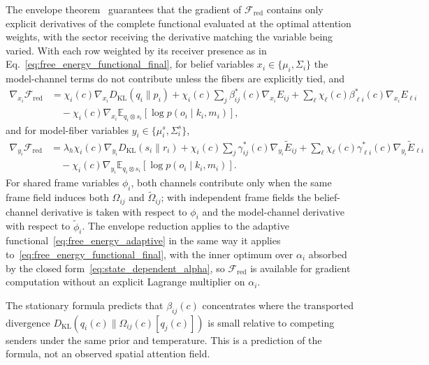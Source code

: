 \documentclass[11pt]{article}
\begin{document}
The envelope theorem~\cite{MilgromSegal2002} guarantees that the gradient of $\mathcal{F}_{\mathrm{red}}$ contains only explicit derivatives of the complete functional evaluated at the optimal attention weights, with the sector receiving the derivative matching the variable being varied. With each row weighted by its receiver presence as in Eq.~\eqref{eq:free_energy_functional_final}, for belief variables $x_i \in \{\mu_i,\Sigma_i\}$ the model-channel terms do not contribute unless the fibers are explicitly tied, and
\begin{equation}
\begin{aligned}
\nabla_{x_i}\mathcal{F}_{\mathrm{red}}
&= \chi_i(c)\nabla_{x_i}D_{\mathrm{KL}}(q_i\|p_i)
+ \chi_i(c)\sum_j \beta^*_{ij}(c)\nabla_{x_i}E_{ij}
+ \sum_\ell \chi_\ell(c)\beta^*_{\ell i}(c)\nabla_{x_i}E_{\ell i} \\
&\quad - \chi_i(c)\nabla_{x_i}\mathbb{E}_{q_i\otimes s_i}[\log p(o_i\mid k_i,m_i)],
\end{aligned}
\label{eq:envelope_gradient_belief}
\end{equation}
and for model-fiber variables $y_i \in \{\mu^s_i,\Sigma^s_i\}$,
\begin{equation}
\begin{aligned}
\nabla_{y_i}\mathcal{F}_{\mathrm{red}}
&= \lambda_h\chi_i(c)\nabla_{y_i}D_{\mathrm{KL}}(s_i\|r_i)
+ \chi_i(c)\sum_j \gamma^*_{ij}(c)\nabla_{y_i}\tilde E_{ij}
+ \sum_\ell \chi_\ell(c)\gamma^*_{\ell i}(c)\nabla_{y_i}\tilde E_{\ell i} \\
&\quad - \chi_i(c)\nabla_{y_i}\mathbb{E}_{q_i\otimes s_i}[\log p(o_i\mid k_i,m_i)].
\end{aligned}
\label{eq:envelope_gradient_model}
\end{equation}
For shared frame variables $\phi_i$, both channels contribute only when the same frame field induces both $\Omega_{ij}$ and $\tilde{\Omega}_{ij}$; with independent frame fields the belief-channel derivative is taken with respect to $\phi_i$ and the model-channel derivative with respect to $\tilde{\phi}_i$. The envelope reduction applies to the adaptive functional~\eqref{eq:free_energy_adaptive} in the same way it applies to~\eqref{eq:free_energy_functional_final}, with the inner optimum over $\alpha_i$ absorbed by the closed form~\eqref{eq:state_dependent_alpha}, so $\mathcal{F}_{\mathrm{red}}$ is available for gradient computation without an explicit Lagrange multiplier on $\alpha_i$.

The stationary formula predicts that $\beta_{ij}(c)$ concentrates where the transported divergence $D_{\mathrm{KL}}(q_i(c)\|\Omega_{ij}(c)[q_j(c)])$ is small relative to competing senders under the same prior and temperature. This is a prediction of the formula, not an observed spatial attention field.
\end{document}
